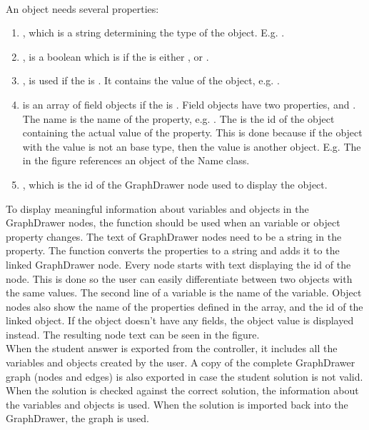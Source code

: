 \\[11pt]
An object needs several properties:
\begin{enumerate}
    \item {}, which is a string determining the type of the object. E.g. .
    \item {}, is a boolean which is  if the  is either ,  or .
    \item {}, is used if the  is . It contains the value of the object, e.g. .
    \item {} is an array of field objects if the  is . Field objects have two properties,  and . The name is the name of the property, e.g. . The  is the id of the object containing the actual value of the property. This is done because if the object with the value is not an base type, then the value is another object. E.g. The  in the figure references an object of the Name class.
    \item {}, which is the id of the GraphDrawer node used to display the object.
\end{enumerate}
To display meaningful information about variables and objects in the GraphDrawer nodes, the  function should be used when an variable or object property changes. The text of GraphDrawer nodes need to be a string in the  property. The function converts the properties to a string and adds it to the linked GraphDrawer node. Every node starts with text displaying the id of the node. This is done so the user can easily differentiate between two objects with the same values. The second line of a variable is the name of the variable. Object nodes also show the name of the properties defined in the  array, and the id of the linked object. If the object doesn't have any fields, the object value is displayed instead. The resulting node text can be seen in the figure.
\\[11pt]
When the student answer is exported from the controller, it includes all the variables and objects created by the user. A copy of the complete GraphDrawer graph (nodes and edges) is also exported in case the student solution is not valid. When the solution is checked against the correct solution, the information about the variables and objects is used. When the solution is imported back into the GraphDrawer, the graph is used.
